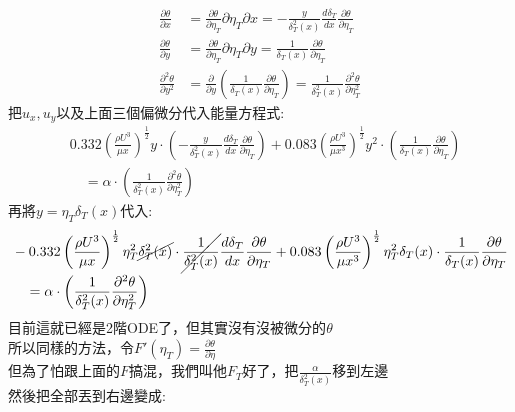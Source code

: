 \documentclass[../main.tex]{subfiles}
\begin{document}
\begin{itemize}
\begin{enumerate}
\begin{align}
      \frac{\partial \theta}{\partial x} & = \frac{\partial \theta}{\partial \eta_T}{\partial \eta_T}{\partial x}
      = -\frac{y}{\delta_T^2(x)}\frac{d\delta_T}{dx}\frac{\partial \theta}{\partial \eta_T} \nonumber\\
      \frac{\partial \theta}{\partial y} & = \frac{\partial \theta}{\partial \eta_T}{\partial \eta_T}{\partial y}
      = \frac{1}{\delta_T(x)} \frac{\partial \theta}{\partial \eta_T} \nonumber\\
      \frac{\partial^2 \theta}{\partial y^2} & = \frac{\partial }{\partial y} \left(
        \frac{1}{\delta_T(x)} \frac{\partial \theta}{\partial \eta_T}
      \right) = \frac{1}{\delta_T^2(x)} \frac{\partial^2 \theta}{\partial \eta_T^2}
    \end{align}
    把$u_x, u_y$以及上面三個偏微分代入能量方程式:
    \begin{align}
      &0.332 \left(
        \frac{\rho U^3}{\mu x}
      \right)^\frac{1}{2} y \cdot \left(
        -\frac{y}{\delta_T^2(x)} \frac{d\delta_T}{dx} \frac{\partial \theta}{\partial \eta_T}
      \right) + 0.083 \left(
        \frac{\rho U^3}{\mu x^3}
      \right)^\frac{1}{2} y^2 \cdot \left(
        \frac{1}{\delta_T(x)} \frac{\partial \theta}{\partial \eta_T}
      \right) \nonumber\\
      &\quad = \alpha \cdot \left(
        \frac{1}{\delta_T^2(x)} \frac{\partial^2 \theta}{\partial \eta_T^2}
      \right)
    \end{align}
    再將$y = \eta_T \delta_T(x)$代入:
    \begin{align}
      & -0.332 \left(
        \frac{\rho U^3}{\mu x}
      \right)^\frac{1}{2} \eta_T^2 \cancel{\delta_T^2(x) }\cdot \cancel{\frac{1}{\delta_T^2(x)} }\frac{d\delta_T}{dx} \frac{\partial \theta}{\partial \eta_T}
      + 0.083 \left(
        \frac{\rho U^3}{\mu x^3}
      \right)^\frac{1}{2} \eta_T^2 \delta_T(x) \cdot \frac{1}{\delta_T(x)} \frac{\partial \theta}{\partial \eta_T} \nonumber\\
      & \quad = \alpha \cdot \left(
        \frac{1}{\delta_T^2(x)} \frac{\partial^2 \theta}{\partial \eta_T^2}
      \right)
    \end{align}
    目前這就已經是2階ODE了，但其實沒有沒被微分的$\theta$\\
    所以同樣的方法，令$F'(\eta_T)=\frac{\partial \theta}{\partial \eta}$\\
    但為了怕跟上面的$F$搞混，我們叫他$F_T$好了，把$\frac{\alpha}{\delta_T^2(x)}$移到左邊\\
    然後把全部丟到右邊變成:
    \begin{equation}

\end{equation}
\end{enumerate}
\end{itemize}
\end{document}
